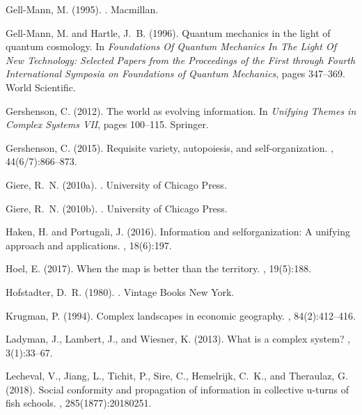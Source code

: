 \begin{thebibliography}{}
Gell-Mann, M. (1995).
.
\newblock Macmillan.

Gell-Mann, M. and Hartle, J.~B. (1996).
\newblock Quantum mechanics in the light of quantum cosmology.
\newblock In {\em Foundations Of Quantum Mechanics In The Light Of New
  Technology: Selected Papers from the Proceedings of the First through Fourth
  International Symposia on Foundations of Quantum Mechanics}, pages 347--369.
  World Scientific.

Gershenson, C. (2012).
\newblock The world as evolving information.
\newblock In {\em Unifying Themes in Complex Systems VII}, pages 100--115.
  Springer.

Gershenson, C. (2015).
\newblock Requisite variety, autopoiesis, and self-organization.
, 44(6/7):866--873.

Giere, R.~N. (2010a).
.
\newblock University of Chicago Press.

Giere, R.~N. (2010b).
.
\newblock University of Chicago Press.

Haken, H. and Portugali, J. (2016).
\newblock Information and selforganization: A unifying approach and
  applications.
, 18(6):197.

Hoel, E. (2017).
\newblock When the map is better than the territory.
, 19(5):188.

Hofstadter, D.~R. (1980).
.
\newblock Vintage Books New York.

Krugman, P. (1994).
\newblock Complex landscapes in economic geography.
, 84(2):412--416.

Ladyman, J., Lambert, J., and Wiesner, K. (2013).
\newblock What is a complex system?
, 3(1):33--67.

Lecheval, V., Jiang, L., Tichit, P., Sire, C., Hemelrijk, C.~K., and Theraulaz,
  G. (2018).
\newblock Social conformity and propagation of information in collective
  u-turns of fish schools.
, 285(1877):20180251.


\end{thebibliography}
